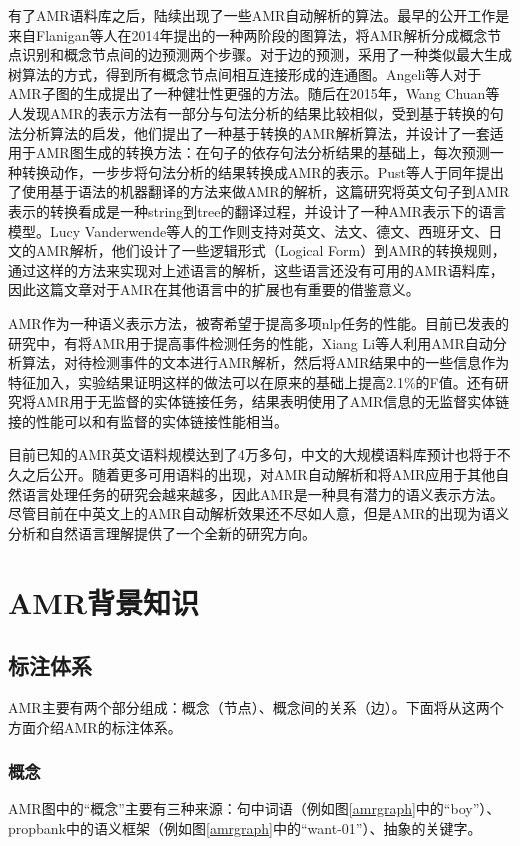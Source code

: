 \documentclass[master, winfont]{njuthesis}
\begin{document}
有了AMR语料库之后，陆续出现了一些AMR自动解析的算法。最早的公开工作是来自Flanigan等人\cite{Flanigan2014}在2014年提出的一种两阶段的图算法，将AMR解析分成概念节点识别和概念节点间的边预测两个步骤。对于边的预测，采用了一种类似最大生成树算法的方式，得到所有概念节点间相互连接形成的连通图。Angeli等人\cite{Angeli2014}对于AMR子图的生成提出了一种健壮性更强的方法。随后在2015年，Wang Chuan\cite{Wang2015}等人发现AMR的表示方法有一部分与句法分析的结果比较相似，受到基于转换的句法分析算法的启发，他们提出了一种基于转换的AMR解析算法，并设计了一套适用于AMR图生成的转换方法：在句子的依存句法分析结果的基础上，每次预测一种转换动作，一步步将句法分析的结果转换成AMR的表示。Pust等人\cite{Pust2015}于同年提出了使用基于语法的机器翻译的方法来做AMR的解析，这篇研究将英文句子到AMR表示的转换看成是一种string到tree的翻译过程，并设计了一种AMR表示下的语言模型。Lucy Vanderwende等人\cite{Vanderwende2015}的工作则支持对英文、法文、德文、西班牙文、日文的AMR解析，他们设计了一些逻辑形式（Logical Form）到AMR的转换规则，通过这样的方法来实现对上述语言的解析，这些语言还没有可用的AMR语料库，因此这篇文章对于AMR在其他语言中的扩展也有重要的借鉴意义。

AMR作为一种语义表示方法，被寄希望于提高多项nlp任务的性能。目前已发表的研究中，有将AMR用于提高事件检测任务的性能\cite{kai2015improving}，Xiang Li等人利用AMR自动分析算法，对待检测事件的文本进行AMR解析，然后将AMR结果中的一些信息作为特征加入，实验结果证明这样的做法可以在原来的基础上提高2.1\%的F值。还有研究将AMR用于无监督的实体链接任务\cite{Pan2015}，结果表明使用了AMR信息的无监督实体链接的性能可以和有监督的实体链接性能相当。

目前已知的AMR英文语料规模达到了4万多句，中文的大规模语料库预计也将于不久之后公开。随着更多可用语料的出现，对AMR自动解析和将AMR应用于其他自然语言处理任务的研究会越来越多，因此AMR是一种具有潜力的语义表示方法。尽管目前在中英文上的AMR自动解析效果还不尽如人意，但是AMR的出现为语义分析和自然语言理解提供了一个全新的研究方向。

\section{AMR背景知识}
\label{amrback}
\subsection{标注体系}
AMR主要有两个部分组成：概念（节点）、概念间的关系（边）。下面将从这两个方面介绍AMR的标注体系。

\subsubsection{概念}
AMR图中的“概念”主要有三种来源：句中词语（例如图\ref{amrgraph}中的“boy”）、propbank中的语义框架（例如图\ref{amrgraph}中的“want-01”）、抽象的关键字。
\end{document}
